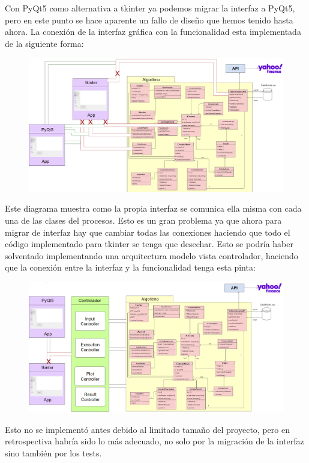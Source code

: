 \documentclass[12pt,a4paper]{article}
\begin{document}
	 Con PyQt5 como alternativa a tkinter ya podemos migrar la interfaz a PyQt5, pero en este punto se hace aparente un fallo de diseño que hemos tenido hasta ahora. La conexión de la interfaz gráfica con la funcionalidad esta implementada de la siguiente forma:\\
\begin{figure}[H]
\centering
  \centering
  \includegraphics[width=1\linewidth]{Diagrama mal}
\label{fig:subrgrafo}
\end{figure}
	 Este diagrama muestra como la propia interfaz se comunica ella misma con cada una de las clases del procesos. Esto es un gran problema ya que ahora para migrar de interfaz hay que cambiar todas las conexiones haciendo que todo el código implementado para tkinter se tenga que desechar. Esto se podría haber solventado implementando una arquitectura modelo vista controlador, haciendo que la conexión entre la interfaz y la funcionalidad tenga esta pinta:\\
\begin{figure}[H]
\centering
  \centering
  \includegraphics[width=1\linewidth]{Diagrama bien}
\label{fig:subrgrafo}
\end{figure}
	 Esto no se implementó antes debido al limitado tamaño del proyecto, pero en retrospectiva habría sido lo más adecuado, no solo por la migración de la interfaz sino también por los tests.\\
\end{document}
